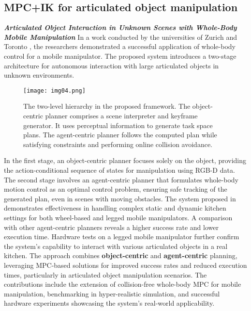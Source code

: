 \subsection{MPC+IK for articulated object manipulation}

\textbf{\textit{Articulated Object Interaction in Unknown Scenes
		with Whole-Body Mobile Manipulation}} \quad
In a work conducted by the universities of Zurich and Toronto \cite{mittal2022articulated},
the researchers demonstrated a successful application of whole-body control for a mobile
manipulator. The proposed system introduces a two-stage architecture for autonomous interaction
with large articulated objects in unknown environments.

\begin{figure}[ht]
	\centering
	\texttt{[image: img04.png]}
	\captionsetup{width=0.9\linewidth}
	\caption{ The two-level hierarchy in the proposed framework. The
		object-centric planner comprises a scene interpreter and keyframe
		generator. It uses perceptual information to generate task space
		plans. The agent-centric planner follows the computed plan while
		satisfying constraints and performing online collision avoidance.
		\cite{mittal2022articulated}}
	\label{fig:img04}
\end{figure}


In the first stage, an object-centric planner focuses solely on the object, providing
the action-conditional sequence of states for manipulation using RGB-D data.
The second stage involves an agent-centric planner that formulates whole-body motion control
as an optimal control problem, ensuring safe tracking of the generated plan, even in scenes
with moving obstacles.
The system proposed in \cite{mittal2022articulated} demonstrates effectiveness in handling complex static and
dynamic kitchen settings for both wheel-based and legged mobile manipulators. A comparison with
other agent-centric planners reveals a higher success rate and lower execution time. Hardware
tests on a legged mobile manipulator further confirm the system's capability to interact with
various articulated objects in a real kitchen. The approach combines \textbf{object-centric} and
\textbf{agent-centric} planning, leveraging MPC-based solutions for improved success rates and reduced
execution times, particularly in articulated object manipulation scenarios. The contributions
include the extension of collision-free whole-body MPC for mobile manipulation, benchmarking
in hyper-realistic simulation, and successful hardware experiments showcasing the system's
real-world applicability.

